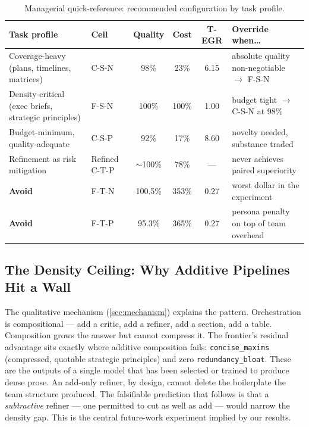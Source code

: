 \documentclass[12pt,a4paper]{article}
\begin{document}
\begin{table}[ht]
  \centering
  \caption{Managerial quick-reference: recommended configuration by task profile.}
  \label{tab:managerial}
  \begin{tabularx}{\textwidth}{@{}l l cc c l@{}}
    \toprule
    \textbf{Task profile} & \textbf{Cell} & \textbf{Quality} & \textbf{Cost} & \textbf{T-EGR} & \textbf{Override when\ldots} \\
    \midrule
    Coverage-heavy (plans, timelines, matrices)
      & C-S-N & 98\% & 23\% & 6.15
      & absolute quality non-negotiable $\to$ F-S-N \\
    Density-critical (exec briefs, strategic principles)
      & F-S-N & 100\% & 100\% & 1.00
      & budget tight $\to$ C-S-N at 98\% \\
    Budget-minimum, quality-adequate
      & C-S-P & 92\% & 17\% & 8.60
      & novelty needed, substance traded \\
    Refinement as risk mitigation
      & Refined C-T-P & $\sim$100\% & 78\% & ---
      & never achieves paired superiority \\
    \textbf{Avoid}
      & F-T-N & 100.5\% & 353\% & 0.27
      & worst dollar in the experiment \\
    \textbf{Avoid}
      & F-T-P & 95.3\% & 365\% & 0.27
      & persona penalty on top of team overhead \\
    \bottomrule
  \end{tabularx}
\end{table}

\subsection{The Density Ceiling: Why Additive Pipelines Hit a Wall}

The qualitative mechanism (\cref{sec:mechanism}) explains the pattern.
Orchestration is compositional --- add a critic, add a refiner, add a section,
add a table. Composition grows the answer but cannot compress it. The frontier's
residual advantage sits exactly where additive composition fails:
\texttt{concise\_maxims} (compressed, quotable strategic principles) and zero
\texttt{redundancy\_bloat}. These are the outputs of a single model that has
been selected or trained to produce dense prose. An add-only refiner, by design,
cannot delete the boilerplate the team structure produced. The falsifiable
prediction that follows is that a \emph{subtractive} refiner --- one permitted
to cut as well as add --- would narrow the density gap. This is the central
future-work experiment implied by our results.
\end{document}
